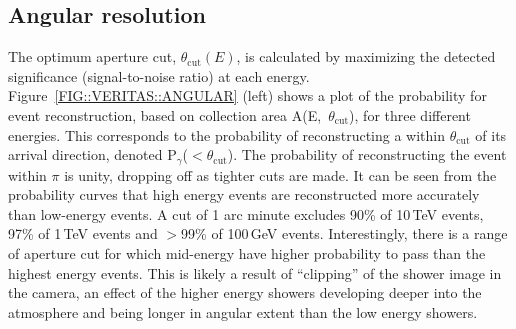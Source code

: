 \subsection{Angular resolution}
\label{SEC::VERITAS::V4ANGRESOLUTION}

The optimum aperture cut, $\theta_\mathrm{cut}(E)$, is calculated by
maximizing the detected \Gray significance (signal-to-noise ratio) at
each energy.  Figure~\ref{FIG::VERITAS::ANGULAR} (left) shows a plot
of the probability for event reconstruction, based on collection area
A(E,~$\theta_\mathrm{cut}$), for three different energies. This
corresponds to the probability of reconstructing a \Gray within
$\theta_\mathrm{cut}$ of its arrival direction, denoted
P$_\gamma$($<\theta_\mathrm{cut}$). The probability of reconstructing
the event within $\pi$ is unity, dropping off as tighter cuts are
made. It can be seen from the probability curves that high energy
events are reconstructed more accurately than low-energy events. A cut
of 1 arc minute excludes 90\% of 10\,TeV events, 97\% of 1\,TeV events
and $>$99\% of 100\,GeV events. Interestingly, there is a range of
aperture cut for which mid-energy \Grays have higher probability to
pass than the highest energy events. This is likely a result of
``clipping'' of the shower image in the camera, an effect of the
higher energy showers developing deeper into the atmosphere and being
longer in angular extent than the low energy showers.

